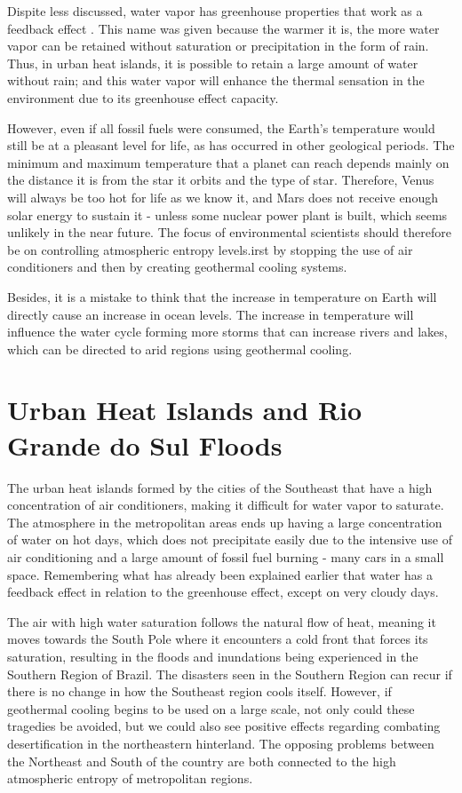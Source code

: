 Dispite less discussed, water vapor has greenhouse properties that work as a feedback effect \cite{Soden}. This name was given because the warmer it is, the more water vapor can be retained without saturation or precipitation in the form of rain. Thus, in urban heat islands, it is possible to retain a large amount of water without rain; and this water vapor will enhance the thermal sensation in the environment due to its greenhouse effect capacity.

However, even if all fossil fuels were consumed, the Earth's temperature would still be at a pleasant level for life, as has occurred in other geological periods. The minimum and maximum temperature that a planet can reach depends mainly on the distance it is from the star it orbits and the type of star. Therefore, Venus will always be too hot for life as we know it, and Mars does not receive enough solar energy to sustain it - unless some nuclear power plant is built, which seems unlikely in the near future. The focus of environmental scientists should therefore be on controlling atmospheric entropy levels.irst by stopping the use of air conditioners and then by creating geothermal cooling systems.

Besides, it is a mistake to think that the increase in temperature on Earth will directly cause an increase in ocean levels. The increase in temperature will influence the water cycle forming more storms that can increase rivers and lakes, which can be directed to arid regions using geothermal cooling.

\section{Urban Heat Islands and Rio Grande do Sul Floods}

The urban heat islands formed by the cities of the Southeast that have a high concentration of air conditioners, making it difficult for water vapor to saturate. The atmosphere in the metropolitan areas ends up having a large concentration of water on hot days, which does not precipitate easily due to the intensive use of air conditioning and a large amount of fossil fuel burning - many cars in a small space. Remembering what has already been explained earlier that water has a feedback effect in relation to the greenhouse effect, except on very cloudy days.

The air with high water saturation follows the natural flow of heat, meaning it moves towards the South Pole where it encounters a cold front that forces its saturation, resulting in the floods and inundations being experienced in the Southern Region of Brazil. The disasters seen in the Southern Region can recur if there is no change in how the Southeast region cools itself. However, if geothermal cooling begins to be used on a large scale, not only could these tragedies be avoided, but we could also see positive effects regarding combating desertification in the northeastern hinterland. The opposing problems between the Northeast and South of the country are both connected to the high atmospheric entropy of metropolitan regions.